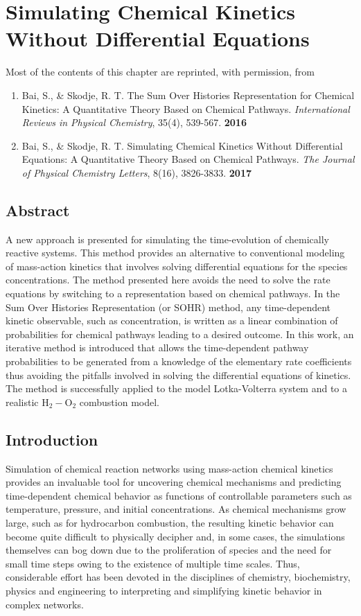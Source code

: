 \chapter{Simulating Chemical Kinetics Without Differential Equations}
\label{chapter4}
Most of the contents of this chapter are reprinted, with permission, from \
\begin{enumerate}
\item[\cite{ch4_10_bai2016sum}] Bai, S., \& Skodje, R. T. The Sum Over Histories Representation for Chemical Kinetics: A Quantitative Theory Based on Chemical Pathways. \textit{International Reviews in Physical Chemistry}, 35(4), 539-567. \textbf{2016}
\item[\cite{ch1_IRPC_18_bai2017simulating}] Bai, S., \& Skodje, R. T. Simulating Chemical Kinetics Without Differential Equations: A Quantitative Theory Based on Chemical Pathways. \textit{The Journal of Physical Chemistry Letters}, 8(16), 3826-3833. \textbf{2017}
\end{enumerate}

\section{Abstract}
\label{ch4:sec:abstract}
A new approach is presented for simulating the time-evolution of chemically reactive systems.  This method provides an alternative to conventional modeling of mass-action kinetics that involves solving differential equations for the species concentrations.  The method presented here avoids the need to solve the rate equations by switching to a representation based on chemical pathways.  In the Sum Over Histories Representation (or SOHR) method, any time-dependent kinetic observable, such as concentration, is written as a linear combination of probabilities for chemical pathways leading to a desired outcome.  In this work, an iterative method is introduced that allows the time-dependent pathway probabilities to be generated from a knowledge of the elementary rate coefficients thus avoiding the pitfalls involved in solving the differential equations of kinetics.  The method is successfully applied to the model Lotka-Volterra system and to a realistic H$_2-$O$_2$ combustion model.

\section{Introduction}
\label{ch4:sec:intro}
Simulation of chemical reaction networks using mass-action chemical kinetics provides an invaluable tool for uncovering chemical mechanisms and predicting time-dependent chemical behavior as functions of controllable parameters such as temperature, pressure, and initial concentrations.  As chemical mechanisms grow large, such as for hydrocarbon combustion, the resulting kinetic behavior can become quite difficult to physically decipher and, in some cases, the simulations themselves can bog down due to the proliferation of species and the need for small time steps owing to the existence of multiple time scales.  Thus, considerable effort has been devoted in the disciplines of chemistry, biochemistry, physics and engineering to interpreting and simplifying kinetic behavior in complex networks.
\newline
